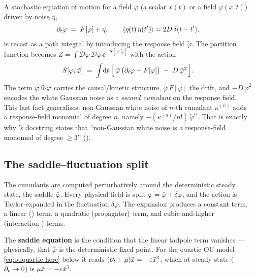 A stochastic equation of motion for a field $\varphi$ (a scalar $x(t)$ or a field
$\varphi(x,t)$) driven by noise $\eta$,
\begin{equation}
  \partial_t\varphi \;=\; F[\varphi] + \eta,
  \qquad \left\langle \eta(t)\,\eta(t') \right\rangle = 2D\,\delta(t-t'),
  \label{eq:eom}
\end{equation}
is recast as a path integral by introducing the response field $\tilde\varphi$.
The partition function becomes $Z = \int\!\mathcal{D}\varphi\,\mathcal{D}\tilde\varphi\,
\ee^{-S[\varphi,\tilde\varphi]}$ with the \msrjd{} action
\begin{equation}
  S[\varphi,\tilde\varphi] \;=\; \int\!\mathrm{d} t\;
  \Big[\, \tilde\varphi\,\big(\partial_t\varphi - F[\varphi]\big)
        \;-\; D\,\tilde\varphi^{2} \,\Big].
  \label{eq:action}
\end{equation}
The term $\tilde\varphi\,\partial_t\varphi$ carries the causal/kinetic structure,
$\tilde\varphi\,F[\varphi]$ the drift, and $-D\,\tilde\varphi^{2}$ encodes the
white Gaussian noise as a \emph{second cumulant} on the response field. This last
fact generalises: non-Gaussian white noise of $n$-th cumulant $\kappa^{(n)}$ adds
a response-field monomial of degree $n$, namely
$-(\kappa^{(n)}/n!)\,\tilde\varphi^{n}$. That is exactly why
's docstring states that ``non-Gaussian white noise is a
response-field monomial of degree $\ge 3$'' ().

\subsection{The saddle--fluctuation split}

The cumulants are computed perturbatively around the deterministic steady state,
the saddle $\bar\varphi$. Every physical field is split
$\varphi = \bar\varphi + \delta\varphi$, and the action is Taylor-expanded in the
fluctuation $\delta\varphi$. The expansion produces a constant term, a linear
() term, a quadratic (propagator) term, and cubic-and-higher
(interaction-) terms.

\begin{defn}
The \textbf{saddle equation} is the condition that the linear tadpole term
vanishes --- physically, that $\bar\varphi$ is the deterministic fixed point. For
the quartic OU model \eqref{eq:ouquartic-here} below it reads
$(\partial_t+\mu)\bar x = -\varepsilon\bar x^{3}$, which at steady state ($\partial_t\to 0$) is
$\mu\bar x = -\varepsilon\bar x^{3}$.
\end{defn}


